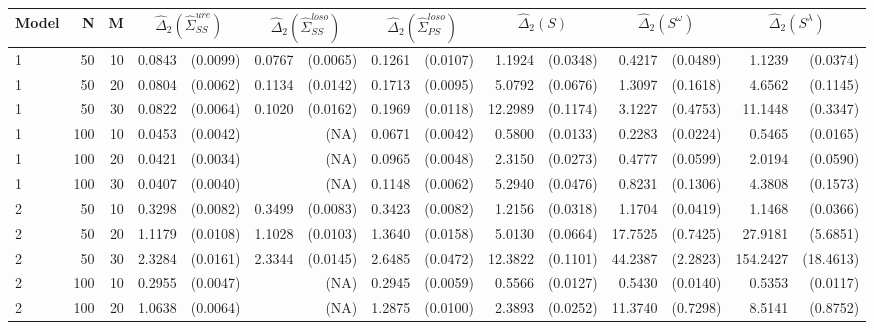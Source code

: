 \begin{table}[ht]
\centering
\begin{small}
\begin{tabular}{lrrrrrrrrrrrrrr}
Model & N & M & \multicolumn{2}{c}{$\hat{\Delta}_2(\hat{\Sigma}^{ure}_{SS})$} &  \multicolumn{2}{c}{$\hat{\Delta}_2(\hat{\Sigma}^{loso}_{SS})$}&  \multicolumn{2}{c}{$\hat{\Delta}_2(\hat{\Sigma}^{loso}_{PS})$} & \multicolumn{2}{c}{$\hat{\Delta}_2(S)$} &  \multicolumn{2}{c}{$\hat{\Delta}_2(S^\omega)$}  &  \multicolumn{2}{c}{$\hat{\Delta}_2(S^\lambda)$}   \\ 
 \hline
1 & 50 & 10 & 0.0843 & (0.0099) & 0.0767 & (0.0065) & 0.1261 & (0.0107) & 1.1924 & (0.0348) & 0.4217 & (0.0489) & 1.1239 & (0.0374) \\ 
  1 & 50 & 20 & 0.0804 & (0.0062) & 0.1134 & (0.0142) & 0.1713 & (0.0095) & 5.0792 & (0.0676) & 1.3097 & (0.1618) & 4.6562 & (0.1145) \\ 
  1 & 50 & 30 & 0.0822 & (0.0064) & 0.1020 & (0.0162) & 0.1969 & (0.0118) & 12.2989 & (0.1174) & 3.1227 & (0.4753) & 11.1448 & (0.3347) \\ 
  1 & 100 & 10 & 0.0453 & (0.0042) &  & (NA) & 0.0671 & (0.0042) & 0.5800 & (0.0133) & 0.2283 & (0.0224) & 0.5465 & (0.0165) \\ 
  1 & 100 & 20 & 0.0421 & (0.0034) &  & (NA) & 0.0965 & (0.0048) & 2.3150 & (0.0273) & 0.4777 & (0.0599) & 2.0194 & (0.0590) \\ 
  1 & 100 & 30 & 0.0407 & (0.0040) &  & (NA) & 0.1148 & (0.0062) & 5.2940 & (0.0476) & 0.8231 & (0.1306) & 4.3808 & (0.1573) \\ 
  2 & 50 & 10 & 0.3298 & (0.0082) & 0.3499 & (0.0083) & 0.3423 & (0.0082) & 1.2156 & (0.0318) & 1.1704 & (0.0419) & 1.1468 & (0.0366) \\ 
  2 & 50 & 20 & 1.1179 & (0.0108) & 1.1028 & (0.0103) & 1.3640 & (0.0158) & 5.0130 & (0.0664) & 17.7525 & (0.7425) & 27.9181 & (5.6851) \\ 
  2 & 50 & 30 & 2.3284 & (0.0161) & 2.3344 & (0.0145) & 2.6485 & (0.0472) & 12.3822 & (0.1101) & 44.2387 & (2.2823) & 154.2427 & (18.4613) \\ 
  2 & 100 & 10 & 0.2955 & (0.0047) &  & (NA) & 0.2945 & (0.0059) & 0.5566 & (0.0127) & 0.5430 & (0.0140) & 0.5353 & (0.0117) \\ 
  2 & 100 & 20 & 1.0638 & (0.0064) &  & (NA) & 1.2875 & (0.0100) & 2.3893 & (0.0252) & 11.3740 & (0.7298) & 8.5141 & (0.8752) \\ 

\end{tabular}
\end{small}
\end{table}

